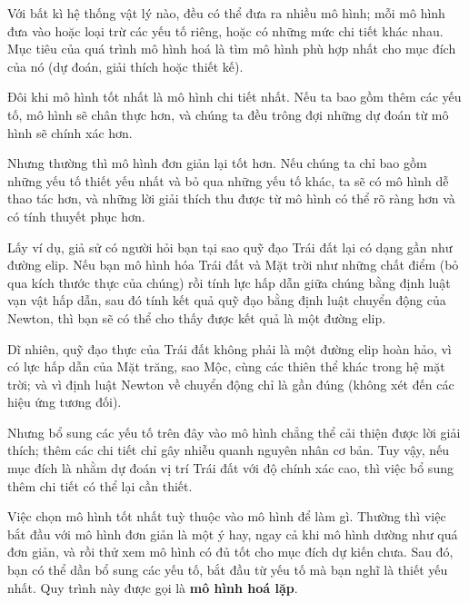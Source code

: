 \documentclass[12pt, openany]{book}
\theoremstyle{exercise}
\begin{document}

Với bất kì hệ thống vật lý nào, đều có thể đưa ra nhiều mô hình; mỗi mô hình đưa vào hoặc loại trừ các yếu tố riêng, hoặc có những mức chi tiết khác nhau. Mục tiêu của quá trình mô hình hoá là tìm mô hình phù hợp nhất cho mục đích của nó (dự đoán, giải thích hoặc thiết kế).


Đôi khi mô hình tốt nhất là mô hình chi tiết nhất. Nếu ta bao gồm thêm các yếu tố, mô hình sẽ chân thực hơn, và chúng ta đều trông đợi những dự đoán từ mô hình sẽ chính xác hơn.


Nhưng thường thì mô hình đơn giản lại tốt hơn. Nếu chúng ta chỉ bao gồm những yếu tố thiết yếu nhất và bỏ qua những yếu tố khác, ta sẽ có mô hình dễ thao tác hơn, và những lời giải thích thu được từ mô hình có thể rõ ràng hơn và có tính thuyết phục hơn.


Lấy ví dụ, giả sử có người hỏi bạn tại sao quỹ đạo Trái đất lại có dạng gần như đường elip. Nếu bạn mô hình hóa Trái đất và Mặt trời như những chất điểm (bỏ qua kích thước thực của chúng) rồi tính lực hấp dẫn giữa chúng bằng định luật vạn vật hấp dẫn, sau đó tính kết quả quỹ đạo bằng định luật chuyển động của Newton, thì bạn sẽ có thể cho thấy được kết quả là một đường elip.


Dĩ nhiên, quỹ đạo thực của Trái đất không phải là một đường elip hoàn hảo, vì có lực hấp dẫn của Mặt trăng, sao Mộc, cùng các thiên thể khác trong hệ mặt trời; và vì định luật Newton về chuyển động chỉ là gần đúng (không xét đến các hiệu ứng tương đối).


Nhưng bổ sung các yếu tố trên đây vào mô hình chẳng thể cải thiện được lời giải thích; thêm các chi tiết chỉ gây nhiễu quanh nguyên nhân cơ bản. Tuy vậy, nếu mục đích là nhằm dự đoán vị trí Trái đất với độ chính xác cao, thì việc bổ sung thêm chi tiết có thể lại cần thiết. 

Việc chọn mô hình tốt nhất tuỳ thuộc vào mô hình để làm gì. Thường thì việc bắt đầu với mô hình đơn giản là một ý hay, ngay cả khi mô hình dường như quá đơn giản, và rồi thử xem mô hình có đủ tốt cho mục đích dự kiến chưa. Sau đó, bạn có thể dần bổ sung các yếu tố, bắt đầu từ yếu tố mà bạn nghĩ là thiết yếu nhất. Quy trình này được gọi là {\bf mô hình hoá lặp}.
\end{document}
